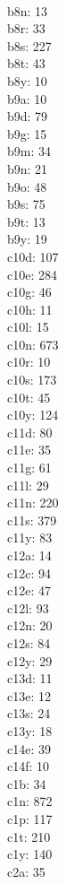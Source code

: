\begin{multicols}{8}
  \\b8n: 13
  \\b8r: 33
  \\b8s: 227
  \\b8t: 43
  \\b8y: 10
  \\b9a: 10
  \\b9d: 79
  \\b9g: 15
  \\b9m: 34
  \\b9n: 21
  \\b9o: 48
  \\b9s: 75
  \\b9t: 13
  \\b9y: 19
  \\c10d: 107
  \\c10e: 284
  \\c10g: 46
  \\c10h: 11
  \\c10l: 15
  \\c10n: 673
  \\c10r: 10
  \\c10s: 173
  \\c10t: 45
  \\c10y: 124
  \\c11d: 80
  \\c11e: 35
  \\c11g: 61
  \\c11l: 29
  \\c11n: 220
  \\c11s: 379
  \\c11y: 83
  \\c12a: 14
  \\c12c: 94
  \\c12e: 47
  \\c12l: 93
  \\c12n: 20
  \\c12s: 84
  \\c12y: 29
  \\c13d: 11
  \\c13e: 12
  \\c13s: 24
  \\c13y: 18
  \\c14e: 39
  \\c14f: 10
  \\c1b: 34
  \\c1n: 872
  \\c1p: 117
  \\c1t: 210
  \\c1y: 140
  \\c2a: 35

\end{multicols}
